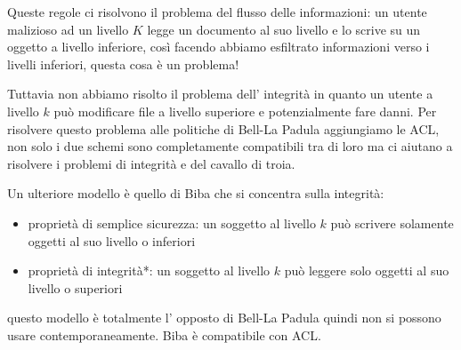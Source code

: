 Queste regole ci risolvono il problema del flusso delle informazioni: un utente malizioso ad un livello $K$ legge un documento al suo livello e lo scrive su un oggetto a livello inferiore, così facendo  abbiamo esfiltrato informazioni verso i livelli inferiori, questa cosa è un problema!

Tuttavia non abbiamo risolto il problema dell' integrità in quanto un utente a livello $k$ può modificare file a livello superiore e potenzialmente fare danni.
Per risolvere questo problema alle politiche di Bell-La Padula aggiungiamo le ACL, non solo i due schemi sono completamente compatibili tra di loro ma ci aiutano a risolvere i problemi di integrità e del cavallo di troia.

Un ulteriore modello è quello di Biba che si concentra sulla integrità:
\begin{itemize}
    \item proprietà di semplice sicurezza: un soggetto al livello $k$ può scrivere solamente oggetti al suo livello o inferiori
    
    \item proprietà di integrità*: un soggetto al livello $k$ può leggere solo oggetti al suo livello o superiori
\end{itemize}
questo modello è totalmente l' opposto di Bell-La Padula quindi non si possono usare contemporaneamente.
Biba è compatibile con ACL.

 
